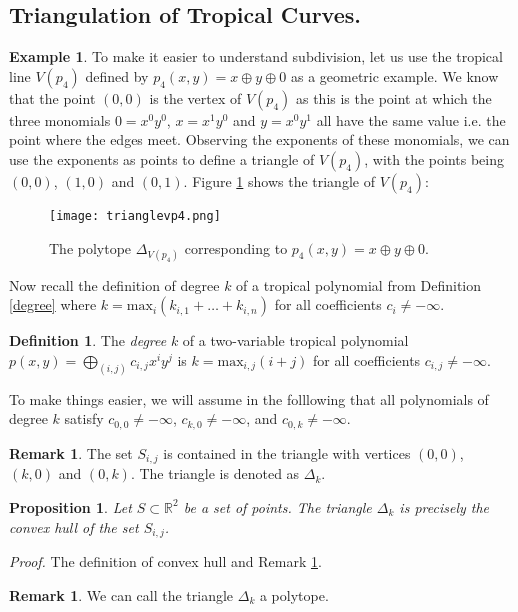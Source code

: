 \documentclass[]{article}
\theoremstyle{definition}
\numberwithin{equation}{section}
\newtheorem{prop}[thm]{Proposition}
\newtheorem{defn}[thm]{Definition}
\newtheorem{examp}[thm]{Example}
\newtheorem{rmk}[thm]{Remark}
\renewcommand{\.}{\,.}
\begin{document}
\subsection{Triangulation of Tropical Curves.} 
\begin{examp}To make it easier to understand subdivision, let us use the tropical line $V(p_4)$ defined by $p_4(x,y)= x\oplus y \oplus0$ as a geometric example. We know that the point $(0,0)$ is the vertex of $V(p_4)$ as this is the point at which the three monomials $0=x^0y^0$, $x=x^1y^0$ and $y=x^0y^1$ all have the same value i.e. the point where the edges meet. Observing the exponents of these monomials, we can use the exponents as points to define a triangle of ${V(p_4)}$, with the points being $(0,0)$, $(1,0)$ and $(0,1)$. Figure \ref{fig:10} shows the triangle of ${V(p_4)}$:



	\begin{figure}[H]
	\centering
	\texttt{[image: trianglevp4.png]}
	\caption{The polytope $\Delta_{V(p_4)}$ corresponding to $p_4(x,y)= x\oplus y \oplus0$.}
	\label{fig:10} \end{figure}
\end{examp}
	\hspace{3mm} Now recall the definition of degree $k$ of a tropical polynomial from Definition \ref{degree} where  $k=\textrm{max}_i(k_{i,1}+\ldots+k_{i,n})$ for all coefficients $c_i\neq-\infty$.
	\begin{defn}
		The \emph{degree} $k$ of a two-variable tropical polynomial $p(x,y)=\bigoplus_{(i,j)}c_{i,j}x^i y^j$ is $k=\textrm{max}_{i,j}(i+j)$ for all coefficients $c_{i,j}\neq-\infty$.
	\end{defn}
\hspace{3mm} To make things easier, we will assume in the folllowing that all polynomials of degree $k$ satisfy $c_{0,0}\neq-\infty$, $c_{k,0}\neq-\infty$, and $c_{0,k}\neq-\infty$.
\begin{rmk} 
	The set $S_{i,j}$ is contained in the triangle with vertices $(0,0)$, $(k,0)$ and $(0,k)$. The triangle is denoted as $\Delta_k$. \label{prf}
\end{rmk}
	 \begin{prop}
	 \emph{Let $S\subset\mathbb{R}^2$ be a set of points. The triangle $\Delta_k$ is precisely the convex hull of the set $S_{i,j}$.}\end{prop}\vspace{-5mm}
	 \hspace{3mm} \emph{Proof.} The definition of convex hull and Remark \ref{prf}.
	\begin{rmk}
	We can call the triangle $\Delta_k$ a polytope.
	\end{rmk}
\end{document}
